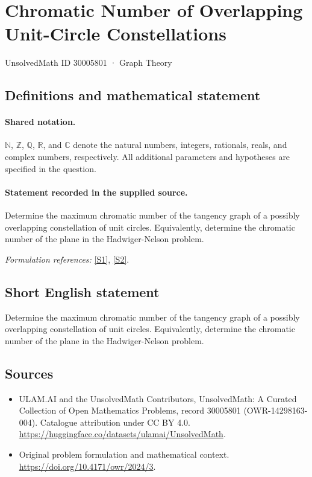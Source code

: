 \documentclass[11pt]{article}
\newcommand{\sref}[2]{\hyperlink{source:#1:#2}{[S#2]}}
\begin{document}
\setcounter{section}{30005800}
\section{Chromatic Number of Overlapping Unit-Circle Constellations}\label{30005801}
{\small UnsolvedMath ID 30005801 · Graph Theory}
\subsection{Definitions and mathematical statement}

\paragraph{Shared notation.}$\mathbb N$, $\mathbb Z$, $\mathbb Q$, $\mathbb R$, and $\mathbb C$ denote the natural numbers, integers, rationals, reals, and complex numbers, respectively. All additional parameters and hypotheses are specified in the question.


\paragraph{Statement recorded in the supplied source.}
Determine the maximum chromatic number of the tangency graph of a possibly overlapping constellation of unit circles. Equivalently, determine the chromatic number of the plane in the Hadwiger-Nelson problem.
\par\smallskip\textit{Formulation references:} \sref{30005801}{1}, \sref{30005801}{2}.
\subsection{Short English statement}
Determine the maximum chromatic number of the tangency graph of a possibly overlapping constellation of unit circles. Equivalently, determine the chromatic number of the plane in the Hadwiger-Nelson problem.
\subsection{Sources}
\begin{itemize}
\item[\hypertarget{source:30005801:1}{S1}] ULAM.AI and the UnsolvedMath Contributors, UnsolvedMath: A Curated Collection of Open Mathematics Problems, record 30005801 (OWR-14298163-004). Catalogue attribution under CC BY 4.0.
\url{https://huggingface.co/datasets/ulamai/UnsolvedMath}.
\item[\hypertarget{source:30005801:2}{S2}] Original problem formulation and mathematical context.
\url{https://doi.org/10.4171/owr/2024/3}.
\end{itemize}
\label{end:30005801}
\end{document}
